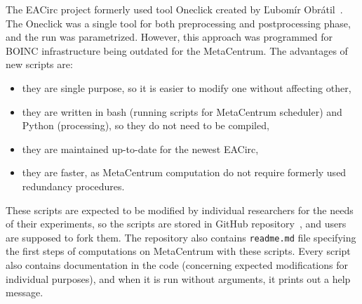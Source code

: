 \documentclass[
    digital,    %
    oneside,    %
    color,
    11pt,
    nocover,
    notable,
    nolof,
    nolot,
]{fithesis3}
\begin{document}
The EACirc project formerly used tool Oneclick created by Ľubomír Obrátil~\cite{obratilBcThesis}. The Oneclick was a single tool for both preprocessing and postprocessing phase, and the run was parametrized. However, this approach was programmed for BOINC infrastructure being outdated for the MetaCentrum. The advantages of new scripts are: 

\begin{itemize}
    \item they are single purpose, so it is easier to modify one without affecting other,
    \item they are written in bash (running scripts for MetaCentrum scheduler) and Python (processing), so they do not need to be compiled,
    \item they are maintained up-to-date for the newest EACirc,
    \item they are faster, as MetaCentrum computation do not require formerly used redundancy procedures.
\end{itemize}

These scripts are expected to be modified by individual researchers for the needs of their experiments, so the scripts are stored in GitHub repository~\cite{eaUtils}, and users are supposed to fork them. The repository also contains \texttt{readme.md} file specifying the first steps of computations on MetaCentrum with these scripts. Every script also contains documentation in the code (concerning expected modifications for individual purposes), and when it is run without arguments, it prints out a help message.
\end{document}
